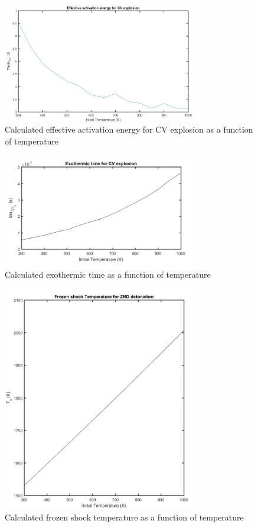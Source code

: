 \documentclass[a4paper]{article}
\begin{document}
\begin{figure}[H]
\centering
\includegraphics[width=0.75\textwidth]{2_eff_act_energy_CVexpl.png}
\caption{\label{fig:part2_1}Calculated effective activation energy for CV explosion as a function of temperature}
\end{figure}

\begin{figure}[H]
\centering
\includegraphics[width=0.75\textwidth]{2_exothermic_time.png}
\caption{\label{fig:part2_2}Calculated exothermic time as a function of temperature}
\end{figure}

\begin{figure}[H]
\centering
\includegraphics[width=0.75\textwidth]{2_frozen_schock_temperature.png}
\caption{\label{fig:part2_3}Calculated frozen shock temperature as a function of temperature}
\end{figure}
\end{document}

